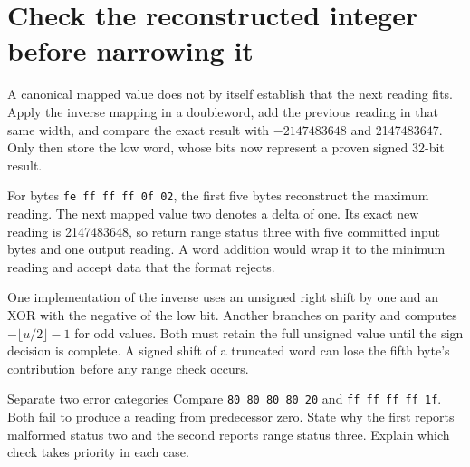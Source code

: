 \section{Check the reconstructed integer before narrowing it}
A canonical mapped value does not by itself establish that the next reading fits.
Apply the inverse mapping in a doubleword, add the previous reading in that same width,
and compare the exact result with \(-2147483648\) and 2147483647. Only then store the
low word, whose bits now represent a proven signed 32-bit result.

For bytes \texttt{fe ff ff ff 0f 02}, the first five bytes reconstruct the maximum
reading. The next mapped value two denotes a delta of one. Its exact new reading is
2147483648, so return range status three with five committed input bytes and one
output reading. A word addition would wrap it to the minimum reading and accept data
that the format rejects.

One implementation of the inverse uses an unsigned right shift by one and an XOR with
the negative of the low bit. Another branches on parity and computes
\(-\lfloor u/2\rfloor-1\) for odd values. Both must retain the full unsigned value
until the sign decision is complete. A signed shift of a truncated word can lose the
fifth byte's contribution before any range check occurs.

\begin{MARSExercise}{Separate two error categories}
  Compare \texttt{80 80 80 80 20} and \texttt{ff ff ff ff 1f}. Both fail to produce a
  reading from predecessor zero. State why the first reports malformed status two and
  the second reports range status three. Explain which check takes priority in each case.
\end{MARSExercise}
